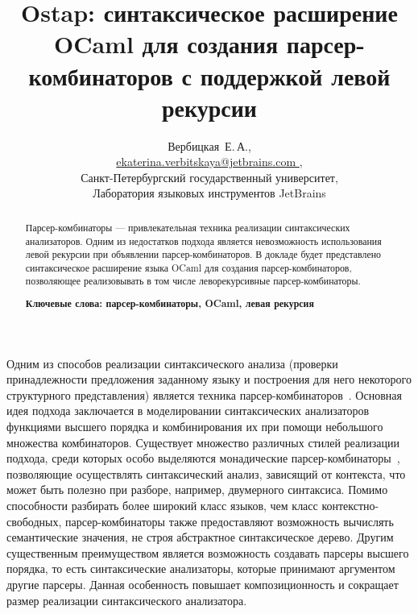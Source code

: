 \documentclass [a4paper] {article}
\begin{document}
\title{Ostap: синтаксическое расширение OCaml для создания парсер-комбинаторов с поддержкой левой рекурсии}
\author{
  Вербицкая~Е.\,А., \\ \url {ekaterina.verbitskaya@jetbrains.com }, \\
  Санкт-Петербургский государственный университет, \\
  Лаборатория языковых инструментов JetBrains 
}

\maketitle

\begin{abstract}
Парсер-комбинаторы --- привлекательная техника реализации синтаксических анализаторов. Одним из недостатков подхода является невозможность использования левой рекурсии при объявлении парсер-комбинаторов. В докладе будет представлено синтаксическое расширение языка OCaml для создания парсер-комбинаторов, позволяющее реализовывать в том числе леворекурсивные парсер-комбинаторы.

\vspace{1em}
\textbf{Ключевые слова: парсер-комбинаторы, OCaml, левая рекурсия}  
\end{abstract}

Одним из способов реализации синтаксического анализа (проверки принадлежности предложения заданному языку и построения для него некоторого структурного представления) является техника парсер-комбинаторов~\cite{hutton1992higher}. Основная идея подхода заключается в моделировании синтаксических анализаторов функциями высшего порядка и комбинирования их при помощи небольшого множества комбинаторов. Существует множество различных стилей реализации подхода, среди которых особо выделяются монадические парсер-комбинаторы~\cite{nott237}, позволяющие осуществлять синтаксический анализ, зависящий от контекста, что может быть полезно при разборе, например, двумерного синтаксиса. Помимо способности разбирать более широкий класс языков, чем класс контекстно-свободных, парсер-комбинаторы также предоставляют возможность вычислять семантические значения, не строя абстрактное синтаксическое дерево. Другим существенным преимуществом является возможность создавать парсеры высшего порядка, то есть синтаксические анализаторы, которые принимают аргументом другие парсеры. Данная особенность повышает композиционность и сокращает размер реализации синтаксического анализатора. 
\end{document}
